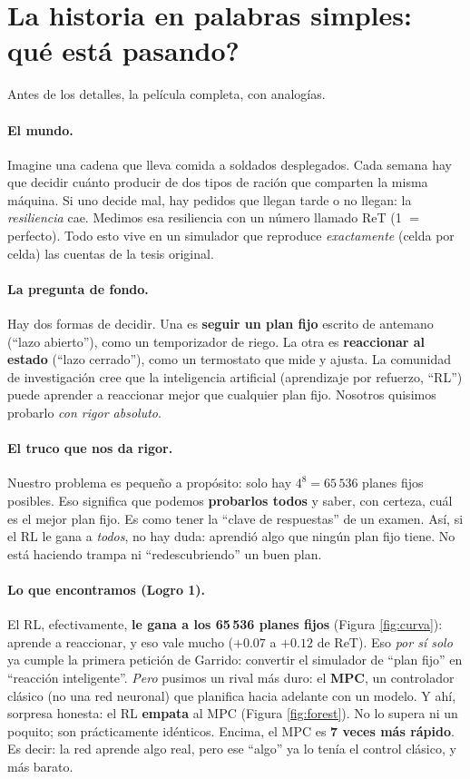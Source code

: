 \documentclass[11pt,a4paper]{article}
\begin{document}
\section{La historia en palabras simples: \textquestiondown{}qué está pasando?}\label{sec:historia}
Antes de los detalles, la película completa, con analogías.

\paragraph{El mundo.} Imagine una cadena que lleva comida a soldados desplegados. Cada semana hay que
decidir cuánto producir de dos tipos de ración que comparten la misma máquina. Si uno decide mal, hay
pedidos que llegan tarde o no llegan: la \emph{resiliencia} cae. Medimos esa resiliencia con un número
llamado ReT (1 $=$ perfecto). Todo esto vive en un simulador que reproduce \emph{exactamente} (celda por
celda) las cuentas de la tesis original.

\paragraph{La pregunta de fondo.} Hay dos formas de decidir. Una es \textbf{seguir un plan fijo}
escrito de antemano (``lazo abierto''), como un temporizador de riego. La otra es \textbf{reaccionar al
estado} (``lazo cerrado''), como un termostato que mide y ajusta. La comunidad de investigación cree
que la inteligencia artificial (aprendizaje por refuerzo, ``RL'') puede aprender a reaccionar mejor que
cualquier plan fijo. Nosotros quisimos probarlo \emph{con rigor absoluto}.

\paragraph{El truco que nos da rigor.} Nuestro problema es pequeño a propósito: solo hay
$4^8 = 65\,536$ planes fijos posibles. Eso significa que podemos \textbf{probarlos todos} y saber, con
certeza, cuál es el mejor plan fijo. Es como tener la ``clave de respuestas'' de un examen. Así, si el
RL le gana a \emph{todos}, no hay duda: aprendió algo que ningún plan fijo tiene. No está haciendo
trampa ni ``redescubriendo'' un buen plan.

\paragraph{Lo que encontramos (Logro 1).} El RL, efectivamente, \textbf{le gana a los 65\,536 planes
fijos} (Figura \ref{fig:curva}): aprende a reaccionar, y eso vale mucho ($+0.07$ a $+0.12$ de ReT). Eso
\emph{por sí solo} ya cumple la primera petición de Garrido: convertir el simulador de ``plan fijo'' en
``reacción inteligente''. \emph{Pero} pusimos un rival más duro: el \textbf{MPC}, un controlador clásico
(no una red neuronal) que planifica hacia adelante con un modelo. Y ahí, sorpresa honesta: el RL
\textbf{empata} al MPC (Figura \ref{fig:forest}). No lo supera ni un poquito; son prácticamente
idénticos. Encima, el MPC es \textbf{7 veces más rápido}. Es decir: la red aprende algo real, pero ese
``algo'' ya lo tenía el control clásico, y más barato.
\end{document}
